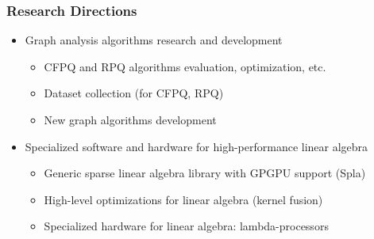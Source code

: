 \documentclass[xcolor=table,aspectratio=169]{beamer}
\begin{document}
\begin{frame}[fragile]
  \frametitle{Research Directions}
  \begin{itemize}
    \item Graph analysis algorithms research and development
    \begin{itemize}
      \item CFPQ and RPQ algorithms evaluation, optimization, etc. 
      \item Dataset collection (for CFPQ, RPQ)
      \item New graph algorithms development
    \end{itemize}
    \item Specialized software and hardware for high-performance linear algebra
    \begin{itemize}
      \item Generic sparse linear algebra library with GPGPU support (Spla)
      \item High-level optimizations for linear algebra (kernel fusion)
      \item Specialized hardware for linear algebra: lambda-processors
    \end{itemize}
    
  \end{itemize}
\end{frame}
\end{document}
